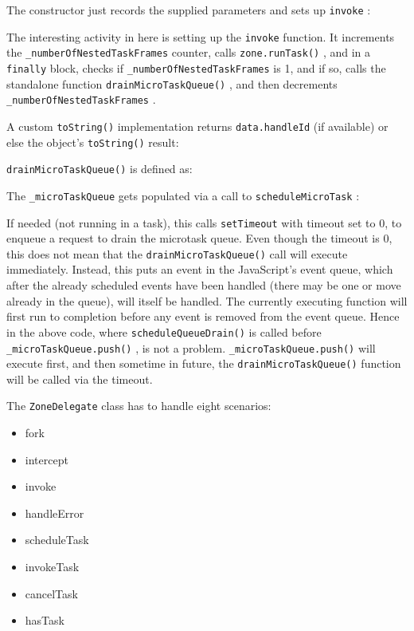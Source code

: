 The constructor just records the supplied parameters and sets up
\texttt{invoke}
:



The interesting activity in here is setting up the
\texttt{invoke}
function. It increments the
\texttt{\_numberOfNestedTaskFrames}
counter, calls
\texttt{zone.runTask()}
, and in a
\texttt{finally}
block,
checks if
\texttt{\_numberOfNestedTaskFrames}
is 1, and if so, calls  the standalone function
\texttt{drainMicroTaskQueue()}
, and then decrements
\texttt{\_numberOfNestedTaskFrames}
.



A custom
\texttt{toString()}
implementation returns
\texttt{data.handleId}
(if available) or else the
object’s
\texttt{toString()}
result:



\texttt{drainMicroTaskQueue()}
is defined as:



The
\texttt{\_microTaskQueue}
gets populated via a call to
\texttt{scheduleMicroTask}
:



If needed (not running in a task), this calls
\texttt{setTimeout}
with timeout set to 0, to
enqueue a request to drain the microtask queue. Even though the timeout is 0, this
does not mean that the
\texttt{drainMicroTaskQueue()}
call will execute immediately.
Instead, this puts an event in the JavaScript’s event queue, which after the already
scheduled events have been handled (there may be one or move already in the
queue), will itself be handled. The currently executing function will first run to
completion before any event is removed from the event queue. Hence in the above
code, where
\texttt{scheduleQueueDrain()}
is called before
\texttt{\_microTaskQueue.push()}
, is not
a problem.
\texttt{\_microTaskQueue.push()}
will execute first, and then sometime in future,
the
\texttt{drainMicroTaskQueue()}
function will be called via the timeout.

The
\texttt{ZoneDelegate}
class has to handle eight scenarios:

\begin{itemize}
  \item fork
  \item intercept
  \item invoke
  \item handleError
  \item scheduleTask
  \item invokeTask
  \item cancelTask
  \item hasTask
\end{itemize}

